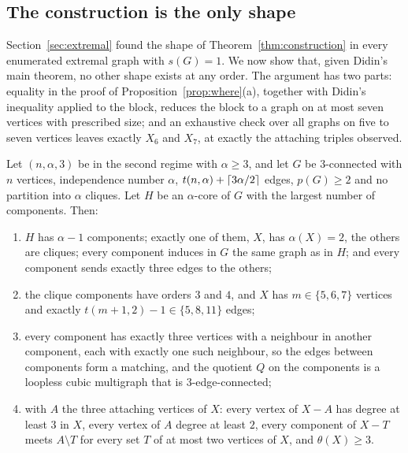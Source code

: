 \subsection{The construction is the only shape}\label{sec:characterisation}

Section~\ref{sec:extremal} found the shape of Theorem~\ref{thm:construction} in every enumerated extremal graph with
$s(G)=1$. We now show that, given Didin's main theorem, no other shape exists at any order. The argument has two
parts: equality in the proof of Proposition~\ref{prop:where}(a), together with Didin's inequality applied to the
block, reduces the block to a graph on at most seven vertices with prescribed size; and an exhaustive check over all
graphs on five to seven vertices leaves exactly $X_6$ and $X_7$, at exactly the attaching triples observed.

\begin{lemma}\label{lem:block-reduction}
Let $(n,\alpha,3)$ be in the second regime with $\alpha\ge3$, and let $G$ be $3$-connected with $n$ vertices,
independence number $\alpha$, $t(n,\alpha)+\left\lceil 3\alpha/2\right\rceil$ edges, $p(G)\ge2$ and no partition into $\alpha$
cliques. Let $H$ be an $\alpha$-core of $G$ with the largest number of components. Then:
\begin{enumerate}
\item[(i)] $H$ has $\alpha-1$ components; exactly one of them, $X$, has $\alpha(X)=2$, the others are cliques; every
component induces in $G$ the same graph as in $H$; and every component sends exactly three edges to the others;
\item[(ii)] the clique components have orders $3$ and $4$, and $X$ has $m\in\{5,6,7\}$ vertices and exactly
$t(m+1,2)-1\in\{5,8,11\}$ edges;
\item[(iii)] every component has exactly three vertices with a neighbour in another component, each with exactly one
such neighbour, so the edges between components form a matching, and the quotient $Q$ on the components is a loopless
cubic multigraph that is $3$-edge-connected;
\item[(iv)] with $A$ the three attaching vertices of $X$: every vertex of $X-A$ has degree at least $3$ in $X$, every
vertex of $A$ degree at least $2$, every component of $X-T$ meets $A\setminus T$ for every set $T$ of at most two
vertices of $X$, and $\theta(X)\ge3$.
\end{enumerate}
\end{lemma}

